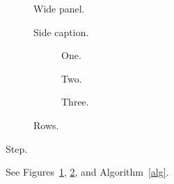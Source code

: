 \documentclass{article}
\begin{document}
\begin{figure}
\begin{minipage}{0.65\linewidth}Wide panel.\end{minipage}\hfill
\begin{minipage}{0.3\linewidth}\caption{Side caption.}\label{f}\end{minipage}
\end{figure}

\begin{figure}
\begin{subfigure}{0.4\linewidth}
\begin{minipage}[c]{0.1\linewidth}\caption{}\label{a}\end{minipage}
\begin{minipage}[c]{0.8\linewidth}One.\end{minipage}
\end{subfigure}
\begin{subfigure}{0.4\linewidth}
\begin{minipage}[c]{0.1\linewidth}\caption{}\label{b}\end{minipage}
\begin{minipage}[c]{0.8\linewidth}Two.\end{minipage}
\end{subfigure}
\begin{subfigure}{0.4\linewidth}
\begin{minipage}[c]{0.1\linewidth}\caption{}\label{c}\end{minipage}
\begin{minipage}[c]{0.8\linewidth}Three.\end{minipage}
\end{subfigure}
\caption{Rows.}
\end{figure}

\begin{algorithm}
\begin{minipage}{\linewidth}\caption{Alg}\label{alg}Step.\end{minipage}
\end{algorithm}
See Figures~\ref{f}, \ref{a}, and Algorithm~\ref{alg}.
\end{document}
